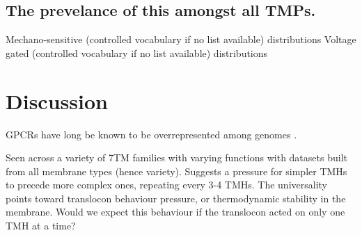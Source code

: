 \subsection{The prevelance of this amongst all TMPs.}
Mechano-sensitive (controlled vocabulary if no list available) distributions
Voltage gated (controlled vocabulary if no list available) distributions

\section{Discussion}
GPCRs have long be known to be overrepresented among genomes \cite{Remm2000}.

Seen across a variety of 7TM families with varying functions with datasets built from all membrane types (hence variety).
Suggests a pressure for simpler TMHs to precede more complex ones, repeating every 3-4 TMHs.
The universality points toward translocon behaviour pressure, or thermodynamic stability in the membrane.
Would we expect this behaviour if the translocon acted on only one TMH at a time?
